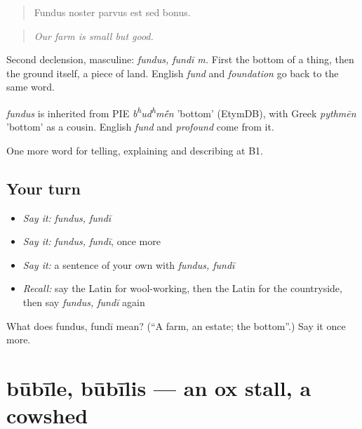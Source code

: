 \begin{quote}
Fundus noster parvus est sed bonus.
\end{quote}

\begin{quote}
\emph{Our farm is small but good.}
\end{quote}

Second declension, masculine: \emph{fundus, fundī m.} First the bottom of a thing, then the ground itself, a piece of land. English \emph{fund} and \emph{foundation} go back to the same word.

\begin{cousinweb}
\emph{fundus} is inherited from PIE \emph{b\textsuperscript{h}ud\textsuperscript{h}m\'{\={e}}n} 'bottom' (EtymDB), with Greek \emph{pythmēn} 'bottom' as a cousin. English \emph{fund} and \emph{profound} come from it.
\end{cousinweb}

\begin{grammarlens}[title={What you've built}]
One more word for telling, explaining and describing at B1.
\end{grammarlens}

\subsection*{Your turn}
\begin{itemize}
\raggedright
  \item \emph{Say it:} \emph{fundus, fundī}
  \item \emph{Say it:} \emph{fundus, fundī}, once more
  \item \emph{Say it:} a sentence of your own with \emph{fundus, fundī}
  \item \emph{Recall:} say the Latin for wool-working, then the Latin for the countryside, then say \emph{fundus, fundī} again
\end{itemize}

\begin{tcolorbox}[breakable,colback=teal!4,colframe=teal!35!black,title={Before you move on}]
What does fundus, fundī mean? (\textquotedblleft{}A farm, an estate; the bottom\textquotedblright{}.) Say it once more.
\end{tcolorbox}
\section[būbīle, būbīlis]{būbīle, būbīlis — an ox stall, a cowshed}

